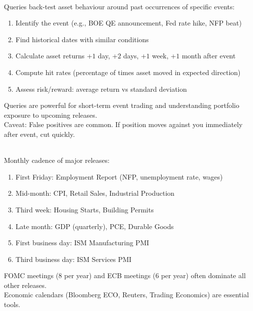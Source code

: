 \documentclass[a4paper,oneside,openany]{book}
\begin{document}
\begin{remark} \\
Queries back-test asset behaviour around past occurrences of specific events:
\begin{enumerate}[label=\roman*.]
\setlength{\itemsep}{0pt}
\item Identify the event (e.g., BOE QE announcement, Fed rate hike, NFP beat)
\item Find historical dates with similar conditions
\item Calculate asset returns +$1$ day, +$2$ days, +$1$ week, +$1$ month after event
\item Compute hit rates (percentage of times asset moved in expected direction)
\item Assess risk/reward: average return vs standard deviation
\end{enumerate}
Queries are powerful for short-term event trading and understanding portfolio exposure to upcoming releases.\\
Caveat: False positives are common. If position moves against you immediately after event, cut quickly.
\end{remark}

\begin{remark} \\
Monthly cadence of major releases:
\begin{enumerate}[label=\roman*.]
\setlength{\itemsep}{0pt}
\item First Friday: Employment Report (NFP, unemployment rate, wages)
\item Mid-month: CPI, Retail Sales, Industrial Production
\item Third week: Housing Starts, Building Permits
\item Late month: GDP (quarterly), PCE, Durable Goods
\item First business day: ISM Manufacturing PMI
\item Third business day: ISM Services PMI
\end{enumerate}
FOMC meetings (8 per year) and ECB meetings (6 per year) often dominate all other releases.\\
Economic calendars (Bloomberg ECO, Reuters, Trading Economics) are essential tools.
\end{remark}
\end{document}
